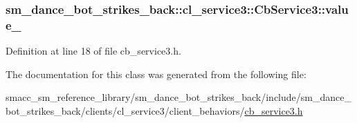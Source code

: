 \subsubsection[{\texorpdfstring{value\+\_\+}{value_}}]{ sm\+\_\+dance\+\_\+bot\+\_\+strikes\+\_\+back\+::cl\+\_\+service3\+::\+Cb\+Service3\+::value\+\_\+\hspace{0.3cm}{\ttfamily [private]}}\hypertarget{classsm__dance__bot__strikes__back_1_1cl__service3_1_1CbService3_a76973df60e0e3ed7d7c270d0701b8f9d}{}\label{classsm__dance__bot__strikes__back_1_1cl__service3_1_1CbService3_a76973df60e0e3ed7d7c270d0701b8f9d}


Definition at line 18 of file cb\+\_\+service3.\+h.



The documentation for this class was generated from the following file\+:\begin{DoxyCompactItemize}
\item 
smacc\+\_\+sm\+\_\+reference\+\_\+library/sm\+\_\+dance\+\_\+bot\+\_\+strikes\+\_\+back/include/sm\+\_\+dance\+\_\+bot\+\_\+strikes\+\_\+back/clients/cl\+\_\+service3/client\+\_\+behaviors/\hyperlink{strikes__back_2include_2sm__dance__bot__strikes__back_2clients_2cl__service3_2client__behaviors_2cb__service3_8h}{cb\+\_\+service3.\+h}\end{DoxyCompactItemize}
